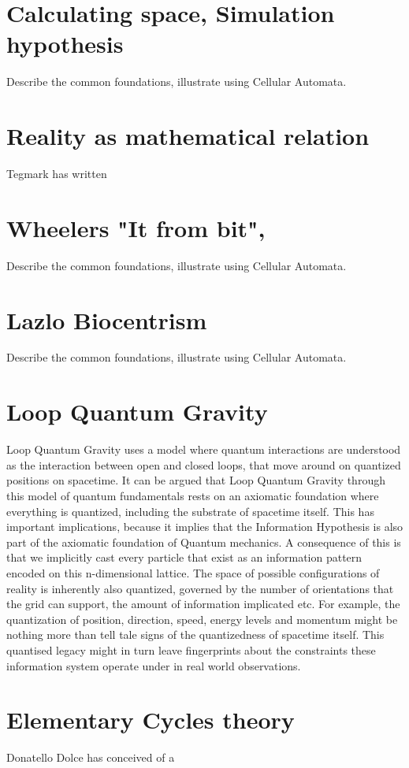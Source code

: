 \documentclass[notitlepage]{report}
\begin{document}
\section*{Calculating space, Simulation hypothesis}
Describe the common foundations, illustrate using Cellular Automata.

\section*{Reality as mathematical relation }
Tegmark has written

\section*{Wheelers "It from bit", }
Describe the common foundations, illustrate using Cellular Automata.

\section*{Lazlo Biocentrism}
Describe the common foundations, illustrate using Cellular Automata.

\section*{Loop Quantum Gravity}
Loop Quantum Gravity uses a model where quantum interactions are understood as the interaction between open and closed loops, that move around on quantized positions on spacetime. It can be argued that Loop Quantum Gravity through this model of quantum fundamentals rests on an axiomatic foundation where everything is quantized, including the substrate of spacetime itself. This has important implications, because it implies that the Information Hypothesis is also part of the axiomatic foundation of Quantum mechanics. A consequence of this is that we implicitly cast every particle that exist as an information pattern encoded on this n-dimensional lattice. 
The space of possible  configurations of reality is inherently also quantized, governed by the number of orientations that the grid can support, the amount of information implicated etc. For example, the quantization of position, direction, speed, energy levels and momentum might be nothing more than tell tale signs of the quantizedness of spacetime itself. This quantised legacy might in turn leave fingerprints about the constraints these information system operate under in real world observations. 

\section{Elementary Cycles theory}
Donatello Dolce has conceived of a 
\end{document}
